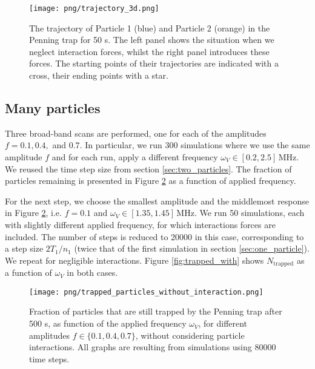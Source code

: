 \begin{figure}
    \texttt{[image: png/trajectory\_3d.png]}
    \caption{The trajectory of Particle 1 (blue) and Particle 2 (orange) in the Penning trap for 50 \textmu s. The left panel shows the situation when we neglect interaction forces, whilst the right panel introduces these forces. The starting points of their trajectories are indicated with a cross, their ending points with a star.}
    \label{fig:3d_trajectory}
\end{figure}
\twocolumngrid





\subsection{Many particles}\label{sec:many_particles}

Three broad-band scans are performed, one for each of the amplitudes $f=0.1, 0.4,$ and $0.7$. In particular, we run 300 simulations where we use the same amplitude $f$ and for each run, apply a different frequency $\omega_V \in[0.2,2.5] \,\mathrm{MHz}$. We reused the time step size from section \ref{sec:two_particles}. The fraction of particles remaining is presented in Figure \ref{fig:trapped_without} as a function of applied frequency. 

For the next step, we choose the smallest amplitude and the middlemost response in Figure \ref{fig:trapped_without}, i.e. $f=0.1$ and $\omega_V \in[1.35,1.45] \,\mathrm{MHz}$. We run 50 simulations, each with slightly different applied frequency, for which interactions forces are included. The number of steps is reduced to 20000 in this case, corresponding to a step size $2 T_1/n_1$ (twice that of the first simulation in section \ref{sec:one_particle}). We repeat for negligible interactions. Figure \ref{fig:trapped_with} shows $N_\mathrm{trapped}$ as a function of $\omega_V$ in both cases. 


\begin{figure}
    \texttt{[image: png/trapped\_particles\_without\_interaction.png]}
    \caption{Fraction of particles that are still trapped by the Penning trap after 500 \textmu s, as function of the applied frequency $\omega_V$, for different amplitudes $f\in\{0.1, 0.4, 0.7\}$, without considering particle interactions. All graphs are resulting from simulations using 80000 time steps.}
    \label{fig:trapped_without}
\end{figure}

